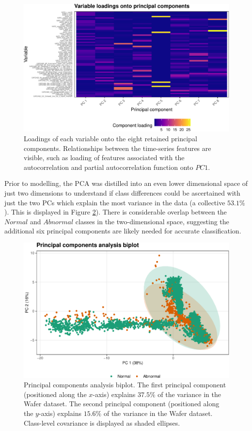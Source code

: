 \documentclass{article}
\begin{document}
\begin{figure}
\centering
\includegraphics{olet5610_report_files/figure-latex/loadplot-1.pdf}
\caption{\label{fig:loadplot}Loadings of each variable onto the eight retained principal components. Relationships between the time-series features are visible, such as loading of features associated with the autocorrelation and partial autocorrelation function onto \(PC 1\).}
\end{figure}

Prior to modelling, the PCA was distilled into an even lower dimensional space of just two dimensions to understand if class differences could be ascertained with just the two PCs which explain the most variance in the data (a collective \(53.1\%\)). This is displayed in Figure \ref{fig:biplot}). There is considerable overlap between the \(Normal\) and \(Abnormal\) classes in the two-dimensional space, suggesting the additional six principal components are likely needed for accurate classification.

\begin{figure}
\centering
\includegraphics{olet5610_report_files/figure-latex/biplot-1.pdf}
\caption{\label{fig:biplot}Principal components analysis biplot. The first principal component (positioned along the \(x\)-axis) explains \(37.5\%\) of the variance in the Wafer dataset. The second principal component (positioned along the \(y\)-axis) explains \(15.6\%\) of the variance in the Wafer dataset. Class-level covariance is displayed as shaded ellipses.}
\end{figure}
\end{document}
